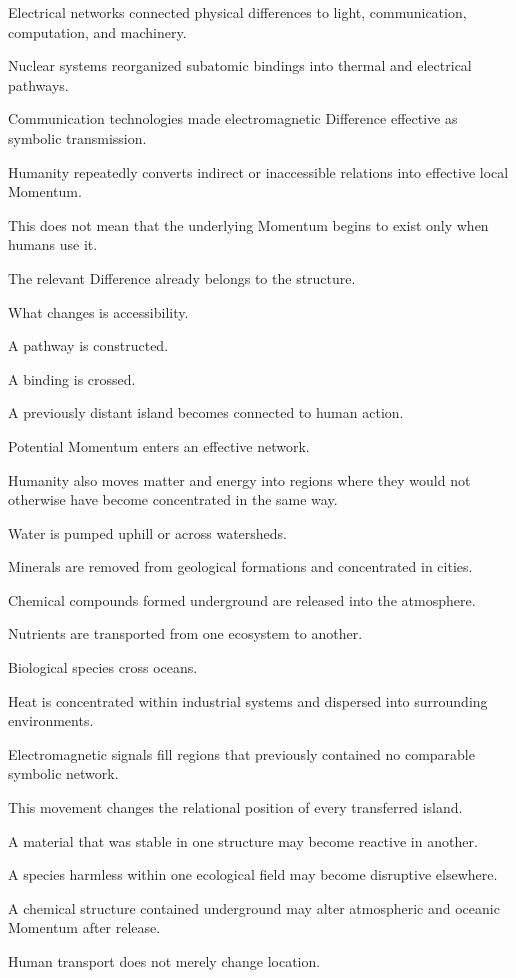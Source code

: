 Electrical networks connected physical differences to light, communication, computation, and machinery.

Nuclear systems reorganized subatomic bindings into thermal and electrical pathways.

Communication technologies made electromagnetic Difference effective as symbolic transmission.

Humanity repeatedly converts indirect or inaccessible relations into effective local Momentum.

This does not mean that the underlying Momentum begins to exist only when humans use it.

The relevant Difference already belongs to the structure.

What changes is accessibility.

A pathway is constructed.

A binding is crossed.

A previously distant island becomes connected to human action.

Potential Momentum enters an effective network.

Humanity also moves matter and energy into regions where they would not otherwise have become concentrated in the same way.

Water is pumped uphill or across watersheds.

Minerals are removed from geological formations and concentrated in cities.

Chemical compounds formed underground are released into the atmosphere.

Nutrients are transported from one ecosystem to another.

Biological species cross oceans.

Heat is concentrated within industrial systems and dispersed into surrounding environments.

Electromagnetic signals fill regions that previously contained no comparable symbolic network.

This movement changes the relational position of every transferred island.

A material that was stable in one structure may become reactive in another.

A species harmless within one ecological field may become disruptive elsewhere.

A chemical structure contained underground may alter atmospheric and oceanic Momentum after release.

Human transport does not merely change location.

